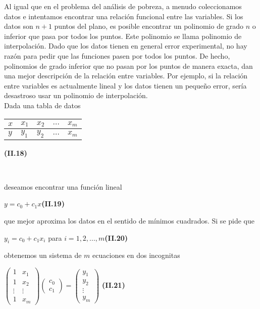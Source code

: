 \documentclass[twocolumn,twoside]{article}
\begin{document}
Al igual que en el problema del an\'alisis de pobreza, a menudo coleccionamos datos e 
intentamos encontrar una relaci\'on funcional entre las variables. Si los datos son $n+1$ 
puntos del plano, es posible encontrar un polinomio de grado $n$ o inferior que pasa por 
todos los puntos. Este polinomio se llama polinomio de interpolaci\'on.
Dado que los datos tienen en general error experimental,
no hay raz\'on para pedir que las funciones pasen por todos los puntos. De hecho, polinomios
de grado inferior que no pasan por los puntos de manera exacta, dan una mejor
descripci\'on de la relaci\'on entre variables. Por ejemplo, si la relaci\'on entre variables es
actualmente lineal y los datos tienen un peque\~no error, ser\'ia desastroso usar un polinomio
de interpolaci\'on.\\
Dada una tabla de datos \\
    \begin{table}[!htb]
    \begin{center}
        
    
    \begin{tabular}{|l|l|l|l|l|}
    \hline
    
    $x$&   $x_{1}$&   $x_{2}$&   $\dots$&  $x_{m}$ \\ \hline
    $y$&   $y_{1}$&   $y_{2}$&   $\dots$&  $x_{m}$ \\ 
    \hline 
    \end{tabular}
    \hspace{1cm}\textbf{(II.18)}
    \end{center}
    \end{table} 
\
\
\

deseamos encontrar una funci\'on lineal
\begin{center}
  $y = c_0 + c_1 x $\hspace{2cm}\textbf{(II.19)}

\end{center}
que mejor aproxima los datos en el sentido de m\'inimos cuadrados. Si se pide que
\begin{center}
  $y_i = c_0 + c_1 x_i$ para $i = 1, 2, . . . , m$\hspace{0.5cm}\textbf{(II.20)}

\end{center}
obtenemos un sistema de $m$ ecuaciones en dos incognitas
\begin{center}
$ 
\left( \begin{array}{cc}
  1 & x_1\\ 
  1 & x_2  \\
  \vdots & \vdots  \\
  1 & x_m 
 \end{array} \right) 
 \left( \begin{array}{c}
  c_0\\ 
  c_1  
 \end{array} \right) =
 \left( \begin{array}{c}
  y_1\\ 
  y_2 \\
  \vdots \\
  y_m
 \end{array} \right)$
\hspace{0.25cm}\textbf{(II.21)}
\end{center}
\end{document}
